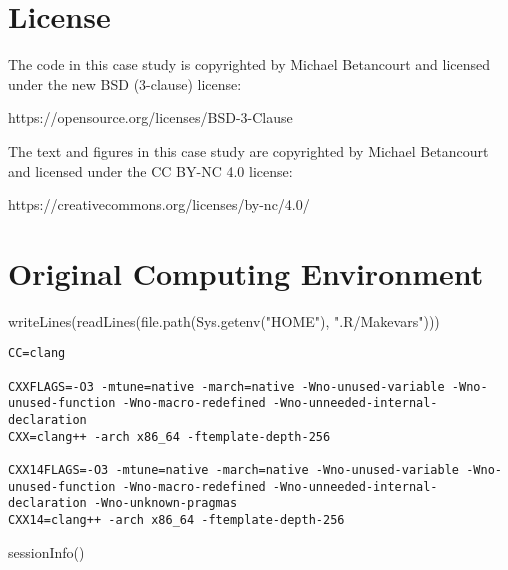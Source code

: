 \documentclass[
  letterpaper,
  DIV=11,
  numbers=noendperiod]{scrartcl}
\newenvironment{Shaded}{\begin{snugshade}}{\end{snugshade}}
\newcommand{\FunctionTok}[1]{\textcolor[rgb]{0.28,0.35,0.67}{#1}}
\newcommand{\NormalTok}[1]{\textcolor[rgb]{0.00,0.23,0.31}{#1}}
\newcommand{\StringTok}[1]{\textcolor[rgb]{0.13,0.47,0.30}{#1}}
\begin{document}
\hypertarget{license}{%
\section*{License}\label{license}}

The code in this case study is copyrighted by Michael Betancourt and
licensed under the new BSD (3-clause) license:

https://opensource.org/licenses/BSD-3-Clause

The text and figures in this case study are copyrighted by Michael
Betancourt and licensed under the CC BY-NC 4.0 license:

https://creativecommons.org/licenses/by-nc/4.0/

\hypertarget{original-computing-environment}{%
\section*{Original Computing
Environment}\label{original-computing-environment}}

\begin{Shaded}
\begin{Highlighting}[]
\FunctionTok{writeLines}\NormalTok{(}\FunctionTok{readLines}\NormalTok{(}\FunctionTok{file.path}\NormalTok{(}\FunctionTok{Sys.getenv}\NormalTok{(}\StringTok{"HOME"}\NormalTok{), }\StringTok{".R/Makevars"}\NormalTok{)))}
\end{Highlighting}
\end{Shaded}

\begin{verbatim}
CC=clang

CXXFLAGS=-O3 -mtune=native -march=native -Wno-unused-variable -Wno-unused-function -Wno-macro-redefined -Wno-unneeded-internal-declaration
CXX=clang++ -arch x86_64 -ftemplate-depth-256

CXX14FLAGS=-O3 -mtune=native -march=native -Wno-unused-variable -Wno-unused-function -Wno-macro-redefined -Wno-unneeded-internal-declaration -Wno-unknown-pragmas
CXX14=clang++ -arch x86_64 -ftemplate-depth-256
\end{verbatim}

\begin{Shaded}
\begin{Highlighting}[]
\FunctionTok{sessionInfo}\NormalTok{()}
\end{Highlighting}
\end{Shaded}
\end{document}
